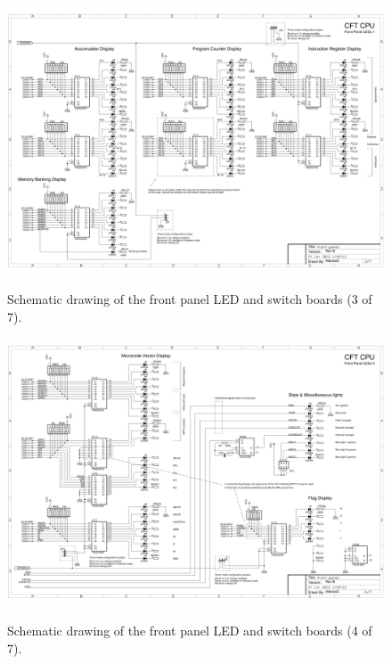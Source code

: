 \documentclass[11pt,a4paper,twocolumns]{article}
\begin{document}
\begin{figure}
\centering
\includegraphics[width=0.95\textheight,angle=90]{figs/front-panel-3.jpg}\\
\caption{\label{fig-schematic-front-panel-3}Schematic drawing of the front panel LED and switch boards (3 of 7).}
\end{figure}

\begin{figure}
\centering
\includegraphics[width=0.95\textheight,angle=90]{figs/front-panel-4.jpg}\\
\caption{\label{fig-schematic-front-panel-4}Schematic drawing of the front panel LED and switch boards (4 of 7).}
\end{figure}
\end{document}
